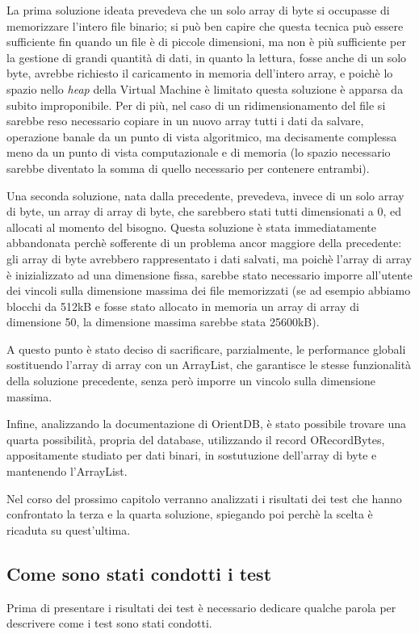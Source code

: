 La prima soluzione ideata prevedeva che un solo array di byte si occupasse di memorizzare l'intero file binario; si può ben capire che questa tecnica può essere sufficiente fin quando un file è di piccole dimensioni, ma non è più sufficiente per la gestione di grandi quantità di dati, in quanto la lettura, fosse anche di un solo byte, avrebbe richiesto il caricamento in memoria dell'intero array, e poichè lo spazio nello \emph{heap} della Virtual Machine è limitato questa soluzione è apparsa da subito improponibile. Per di più, nel caso di un ridimensionamento del file si sarebbe reso necessario copiare in un nuovo array tutti i dati da salvare, operazione banale da un punto di vista algoritmico, ma decisamente complessa meno da un punto di vista computazionale e di memoria (lo spazio necessario sarebbe diventato la somma di quello necessario per contenere entrambi).

Una seconda soluzione, nata dalla precedente, prevedeva, invece di un solo array di byte, un array di array di byte, che sarebbero stati tutti dimensionati a 0, ed allocati al momento del bisogno. Questa soluzione è stata immediatamente abbandonata perchè sofferente di un problema ancor maggiore della precedente: gli array di byte avrebbero rappresentato i dati salvati, ma poichè l'array di array è inizializzato ad una dimensione fissa, sarebbe stato necessario imporre all'utente dei vincoli sulla dimensione massima dei file memorizzati (se ad esempio abbiamo blocchi da 512kB e fosse stato allocato in memoria un array di array di dimensione 50, la dimensione massima sarebbe stata 25600kB).

A questo punto è stato deciso di sacrificare, parzialmente, le performance globali sostituendo l'array di array con un ArrayList, che garantisce le stesse funzionalità della soluzione precedente, senza però imporre un vincolo sulla dimensione massima.

Infine, analizzando la documentazione di OrientDB, è stato possibile trovare una quarta possibilità, propria del database, utilizzando il record ORecordBytes, appositamente studiato per dati binari, in sostutuzione dell'array di byte e mantenendo l'ArrayList.

Nel corso del prossimo capitolo verranno analizzati i risultati dei test che hanno confrontato la terza e la quarta soluzione, spiegando poi perchè la scelta è ricaduta su quest'ultima.

\subsection{Come sono stati condotti i test}
Prima di presentare i risultati dei test è necessario dedicare qualche parola per descrivere come i test sono stati condotti.

